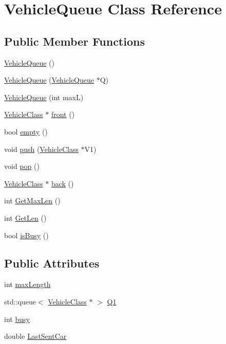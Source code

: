 \hypertarget{class_vehicle_queue}{\section{Vehicle\-Queue Class Reference}
\label{class_vehicle_queue}
}
\subsection*{Public Member Functions}
\begin{DoxyCompactItemize}
\item 
\hyperlink{class_vehicle_queue_a19f80d40ffe612dae9b2cbce39fe1a1a}{Vehicle\-Queue} ()
\item 
\hyperlink{class_vehicle_queue_a84393b3dc29273e9fc18ff6c498c4a95}{Vehicle\-Queue} (\hyperlink{class_vehicle_queue}{Vehicle\-Queue} $\ast$Q)
\item 
\hyperlink{class_vehicle_queue_a3e939caee1688630bf1f9ba50ef0d67e}{Vehicle\-Queue} (int max\-L)
\item 
\hyperlink{class_vehicle_class}{Vehicle\-Class} $\ast$ \hyperlink{class_vehicle_queue_aff7fef0dc6401e38a26bc34ee0e78f2a}{front} ()
\item 
bool \hyperlink{class_vehicle_queue_a9c22a63f1c7562bc14be172a38cffcb9}{empty} ()
\item 
void \hyperlink{class_vehicle_queue_a71dfef194e7e2cbfdca2b724d66301b8}{push} (\hyperlink{class_vehicle_class}{Vehicle\-Class} $\ast$V1)
\item 
void \hyperlink{class_vehicle_queue_ad4f16ccf1a5990172e28b7782051b50a}{pop} ()
\item 
\hyperlink{class_vehicle_class}{Vehicle\-Class} $\ast$ \hyperlink{class_vehicle_queue_a302883b18a07a99dacd614ee5332f09e}{back} ()
\item 
int \hyperlink{class_vehicle_queue_a4d5dc7f4ee55be52e781b252e6260ba1}{Get\-Max\-Len} ()
\item 
int \hyperlink{class_vehicle_queue_ae443ecfa4227dbb5094f1bd33e77abb0}{Get\-Len} ()
\item 
bool \hyperlink{class_vehicle_queue_ada2e9158033c24433b042ab46abe2fb8}{is\-Busy} ()
\end{DoxyCompactItemize}
\subsection*{Public Attributes}
\begin{DoxyCompactItemize}
\item 
int \hyperlink{class_vehicle_queue_a8634f859977fc6937f91abc302d56318}{max\-Length}
\item 
std\-::queue$<$ \hyperlink{class_vehicle_class}{Vehicle\-Class} $\ast$ $>$ \hyperlink{class_vehicle_queue_a64dd34f2ca5bee22e9bf07be665c4d13}{Q1}
\item 
int \hyperlink{class_vehicle_queue_a4ce16496b3665d0b91a8b5baf158c3a3}{busy}
\item 
double \hyperlink{class_vehicle_queue_a329310055fa8fd635fd6740a8400b88d}{Last\-Sent\-Car}
\end{DoxyCompactItemize}


